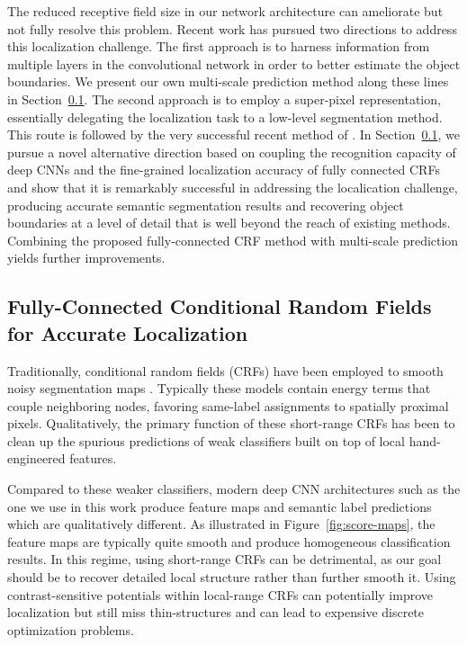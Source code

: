 The reduced receptive field size in our network architecture can ameliorate
but not fully resolve this problem. Recent work has pursued two directions to
address this localization challenge. The first approach is to harness
information from multiple layers in the convolutional network in order to
better estimate the object boundaries. We present our own multi-scale
prediction method along these lines in Section~\ref{}. The second approach is
to employ a super-pixel representation, essentially delegating the
localization task to a low-level segmentation method. This route is followed
by the very successful recent method of \cite{Greg}. In Section~\ref{}, we
pursue a novel alternative direction based on coupling the recognition
capacity of deep CNNs and the fine-grained localization accuracy of fully
connected CRFs and show that it is remarkably successful in addressing the
localication challenge, producing accurate semantic segmentation results and
recovering object boundaries at a level of detail that is well beyond the
reach of existing methods. Combining the proposed fully-connected CRF method
with multi-scale prediction yields further improvements.


\subsection{Fully-Connected Conditional Random Fields for Accurate Localization}

Traditionally, conditional random fields (CRFs) have been employed to smooth
noisy segmentation maps \cite{rother2004grabcut, kohli2009robust}. Typically
these models contain energy terms that couple neighboring nodes, favoring
same-label assignments to spatially proximal pixels. Qualitatively, the
primary function of these short-range CRFs has been to clean up the spurious
predictions of weak classifiers built on top of local hand-engineered features.

Compared to these weaker classifiers, modern deep CNN architectures such as
the one we use in this work produce feature maps and semantic label
predictions which are qualitatively different. As illustrated in
Figure~\ref{fig:score-maps}, the feature maps are typically quite smooth and
produce homogeneous classification results. In this regime, using short-range
CRFs can be detrimental, as our goal should be to recover detailed local
structure rather than further smooth it. Using contrast-sensitive potentials
\cite{rother2004grabcut} within local-range CRFs can potentially improve
localization but still miss thin-structures and can lead to expensive
discrete optimization problems.

